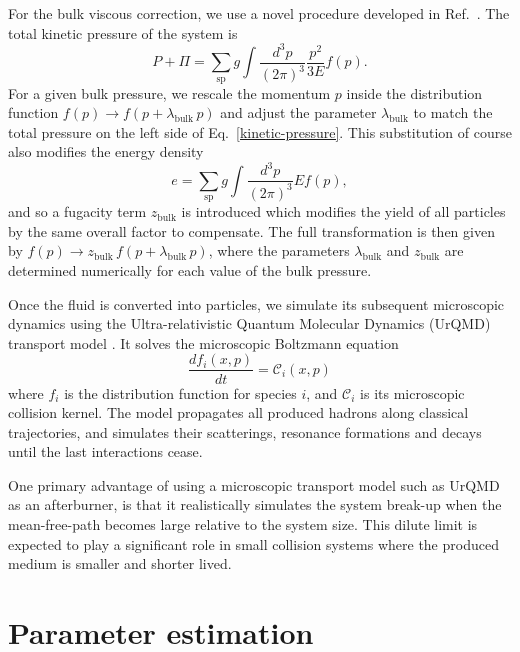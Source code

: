 \documentclass[aps,prc,reprint,amsmath,nofootinbib]{revtex4-1}
\begin{document}
For the bulk viscous correction, we use a novel procedure developed in Ref.~\cite{Bernhard:2018hnz}.
The total kinetic pressure of the system is
\begin{equation}
  \label{kinetic-pressure}
  P + \Pi = \sum\limits_\mathrm{sp} g \int \frac{d^3p}{(2\pi)^3} \frac{p^2}{3E} f(p).
\end{equation}
For a given bulk pressure, we rescale the momentum $p$ inside the distribution function $f(p) \rightarrow f(p + \lambda_\mathrm{bulk}\, p)$ and adjust the parameter $\lambda_\mathrm{bulk}$ to match the total pressure on the left side of Eq.~\eqref{kinetic-pressure}.
This substitution of course also modifies the energy density
\begin{equation}
  e = \sum\limits_\mathrm{sp} g \int \frac{d^3p}{(2 \pi)^3} E f(p),
\end{equation}
and so a fugacity term $z_\mathrm{bulk}$ is introduced which modifies the yield of all particles by the same overall factor to compensate.
The full transformation is then given by $f(p) \rightarrow z_\mathrm{bulk}\, f(p + \lambda_\mathrm{bulk}\, p)$, where the parameters $\lambda_\mathrm{bulk}$ and $z_\mathrm{bulk}$ are determined numerically for each value of the bulk pressure.

Once the fluid is converted into particles, we simulate its subsequent microscopic dynamics using the Ultra-relativistic Quantum Molecular Dynamics (UrQMD) transport model \cite{Bass:1998ca, Bleicher:1999xi}.
It solves the microscopic Boltzmann equation
\begin{equation}
  \frac{df_i(x, p)}{dt} = \mathcal{C}_i(x, p)
\end{equation}
where $f_i$ is the distribution function for species $i$, and $\mathcal{C}_i$ is its microscopic collision kernel.
The model propagates all produced hadrons along classical trajectories, and simulates their scatterings, resonance formations and decays until the last interactions cease.

One primary advantage of using a microscopic transport model such as UrQMD as an afterburner, is that it realistically simulates the system break-up when the mean-free-path becomes large relative to the system size.
This dilute limit is expected to play a significant role in small collision systems where the produced medium is smaller and shorter lived.


\section{Parameter estimation}
\label{sec:calibration}
\end{document}
